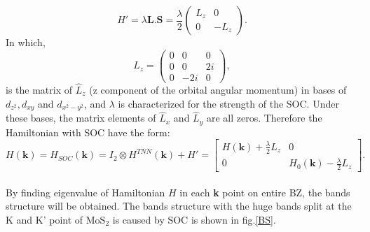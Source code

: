 \documentclass[12pt,english,a4paper]{article}
\begin{document}
	\begin{equation}
		H' = \lambda \textbf{L}.\textbf{S}=\frac{\lambda}{2}\begin{pmatrix}
			L_z &0\\
			0 & -L_z
		\end{pmatrix}.
	\end{equation}
	In which,
	\begin{equation}
		L_z = \begin{pmatrix}
			0 & 0 & 0\\
			0 & 0 & 2i\\
			0 & -2i& 0
		\end{pmatrix},
	\end{equation}
	is the matrix of $\hat{L}_z$ (z component of the orbital angular momentum) in bases of $d_{z^2}, d_{xy}$ and $d_{x^2-y^2}$, and $\lambda$ is characterized for the strength of the SOC. Under these bases, the matrix elements of $\hat{L}_x$ and $\hat{L}_y$ are all zeros. Therefore the Hamiltonian with SOC have the form:
	\begin{equation}
		H(\textbf{k}) = H_{SOC} (\textbf{k}) = I_2 \otimes H^{TNN} (\textbf{k}) +H' = \begin{bmatrix}
			H (\textbf{k}) + \frac{\lambda}{2} L_z & 0\\
			0& H_0 (\textbf{k}) - \frac{\lambda}{2} L_z
		\end{bmatrix}.
	\end{equation}
	\\By finding eigenvalue of Hamiltonian $H$ in each \textbf{k} point on entire BZ, the bands structure will be obtained. The bands structure with the huge bands split at the K and K' point of $\mathrm{MoS}_2$ is caused by SOC is shown in fig.\ref{BS}.
\end{document}
